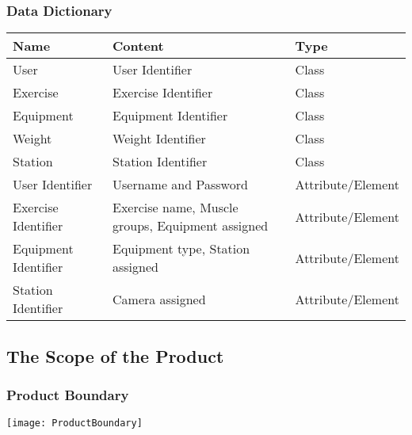 \documentclass{article}
\begin{document}
\subsubsection{Data Dictionary}
\begingroup
\begin{centering}
\begin{tabular}{|p{4cm} | p{6cm} | p{3cm}|}
    \hline
    \textbf{Name} & \textbf{Content} & \textbf{Type} \\
    \hline
    User & User Identifier & Class \\
    \hline
    Exercise & Exercise Identifier & Class \\
    \hline
    Equipment & Equipment Identifier & Class \\
    \hline
    Weight & Weight Identifier & Class \\
    \hline
    Station & Station Identifier & Class \\
    \hline
    User Identifier & Username and Password & Attribute/Element \\
    \hline
    Exercise Identifier & Exercise name, Muscle groups, Equipment assigned & Attribute/Element \\
    \hline
  
    Equipment Identifier & Equipment type, Station assigned & Attribute/Element \\
    \hline
    Station Identifier & Camera assigned & Attribute/Element \\
    \hline
\end{tabular}
\end{centering}
\endgroup

\subsection{The Scope of the Product}

\subsubsection{Product Boundary}
\begingroup
\begin{centering}
\texttt{[image: ProductBoundary]}
\end{centering}
\endgroup
\end{document}
